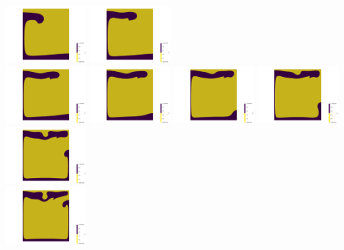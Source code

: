 \begin{itemize}
\begin{center}
\includegraphics[width=3cm]{images/benchmark_vaks97/aspect/lvl7/composition_threshold0003}
\includegraphics[width=3cm]{images/benchmark_vaks97/aspect/lvl7/composition_threshold0004}\\
\includegraphics[width=3cm]{images/benchmark_vaks97/aspect/lvl7/composition_threshold0005}
\includegraphics[width=3cm]{images/benchmark_vaks97/aspect/lvl7/composition_threshold0006}
\includegraphics[width=3cm]{images/benchmark_vaks97/aspect/lvl7/composition_threshold0007}
\includegraphics[width=3cm]{images/benchmark_vaks97/aspect/lvl7/composition_threshold0008}
\includegraphics[width=3cm]{images/benchmark_vaks97/aspect/lvl7/composition_threshold0009}\\
\includegraphics[width=3cm]{images/benchmark_vaks97/aspect/lvl7/composition_threshold0010}

\end{center}
\end{itemize}
